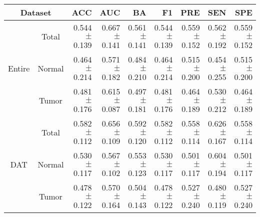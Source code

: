 \begin{tabular}{ccrrrrrrr}
\multicolumn{2}{c}{Dataset} & ACC & AUC & BA & F1 & PRE & SEN & SPE \\ \hline
\multirow{3}{*}{Entire} & \multicolumn{1}{c|}{Total} & 0.544$\pm$0.139 & 0.667$\pm$0.141 & 0.561$\pm$0.141 & 0.544$\pm$0.139 & 0.559$\pm$0.152 & 0.562$\pm$0.192 & 0.559$\pm$0.152 \\
 & \multicolumn{1}{c|}{Normal} & 0.464$\pm$0.214 & 0.571$\pm$0.182 & 0.484$\pm$0.210 & 0.464$\pm$0.214 & 0.515$\pm$0.200 & 0.454$\pm$0.255 & 0.515$\pm$0.200 \\
 & \multicolumn{1}{c|}{Tumor} & 0.481$\pm$0.176 & 0.615$\pm$0.087 & 0.497$\pm$0.181 & 0.481$\pm$0.176 & 0.464$\pm$0.189 & 0.530$\pm$0.212 & 0.464$\pm$0.189 \\ \hline
\multirow{3}{*}{DAT} & \multicolumn{1}{c|}{Total} & 0.582$\pm$0.112 & 0.656$\pm$0.109 & 0.592$\pm$0.120 & 0.582$\pm$0.112 & 0.558$\pm$0.114 & 0.626$\pm$0.167 & 0.558$\pm$0.114 \\
 & \multicolumn{1}{c|}{Normal} & 0.530$\pm$0.117 & 0.567$\pm$0.102 & 0.553$\pm$0.123 & 0.530$\pm$0.117 & 0.501$\pm$0.117 & 0.604$\pm$0.194 & 0.501$\pm$0.117 \\
 & \multicolumn{1}{c|}{Tumor} & 0.478$\pm$0.122 & 0.570$\pm$0.164 & 0.504$\pm$0.143 & 0.478$\pm$0.122 & 0.527$\pm$0.240 & 0.480$\pm$0.119 & 0.527$\pm$0.240
\end{tabular}